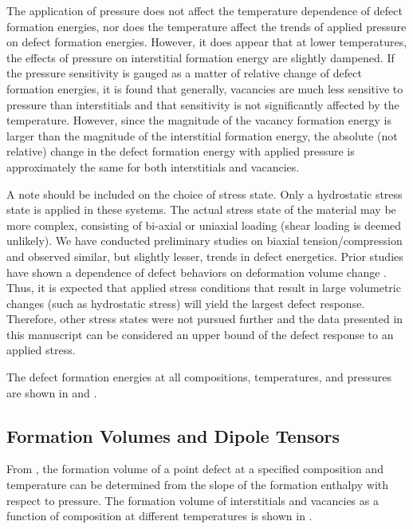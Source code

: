 \documentclass[review]{elsarticle}
\begin{document}
The application of pressure does not affect the temperature dependence of defect formation energies, nor does the temperature affect the trends of applied pressure on defect formation energies. However, it does appear that at lower temperatures, the effects of pressure on interstitial formation energy are slightly dampened. If the pressure sensitivity is gauged as a matter of relative change of defect formation energies, it is found that generally, vacancies are much less sensitive to pressure than interstitials and that sensitivity is not significantly affected by the temperature. However, since the magnitude of the vacancy formation energy is larger than the magnitude of the interstitial formation energy, the absolute (not relative) change in the defect formation energy with applied pressure is approximately the same for both interstitials and vacancies. 

A note should be included on the choice of stress state. Only a hydrostatic stress state is applied in these systems. The actual stress state of the material may be more complex, consisting of bi-axial or uniaxial loading (shear loading is deemed unlikely). We have conducted preliminary studies on biaxial tension/compression and observed similar, but slightly lesser, trends in defect energetics. Prior studies have shown a dependence of defect behaviors on deformation volume change \cite{beeler2015,beeler2016}. Thus, it is expected that applied stress conditions that result in large volumetric changes (such as hydrostatic stress) will yield the largest defect response. Therefore, other stress states were not pursued further and the data presented in this manuscript can be considered an upper bound of the defect response to an applied stress.

The defect formation energies at all compositions, temperatures, and pressures are shown in  and . 

\subsection{Formation Volumes and Dipole Tensors}

From , the formation volume of a point defect at a specified composition and temperature can be determined from the slope of the formation enthalpy with respect to pressure. The formation volume of interstitials and vacancies as a function of composition at different temperatures is shown in .
\end{document}
